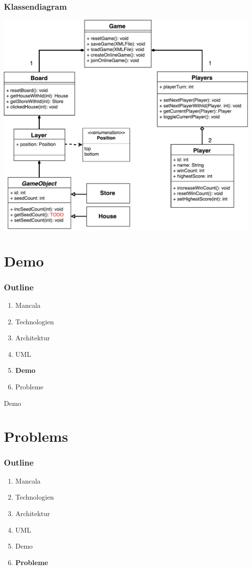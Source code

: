 \documentclass[
	10pt,
	t		%
]{beamer}
\begin{document}
\begin{frame}
\frametitle{Klassendiagram}
\begin{center}
\includegraphics[scale=0.32]{./../Diagrams/ClassDiagram.pdf}
\end{center}
\end{frame}

\section{Demo}
\begin{frame}
\frametitle{Outline}
\begin{enumerate}
\item Mancala
\item Technologien
\item Architektur
\item UML
\item \textbf{Demo}
\item Probleme
\end{enumerate}
\end{frame}

\begin{frame}[plain, c]
\begin{center}
\Large Demo
\end{center}
\end{frame}

\section{Problems}
\begin{frame}
\frametitle{Outline}
\begin{enumerate}
\item Mancala
\item Technologien
\item Architektur
\item UML
\item Demo
\item \textbf{Probleme}
\end{enumerate}
\end{frame}
\end{document}
